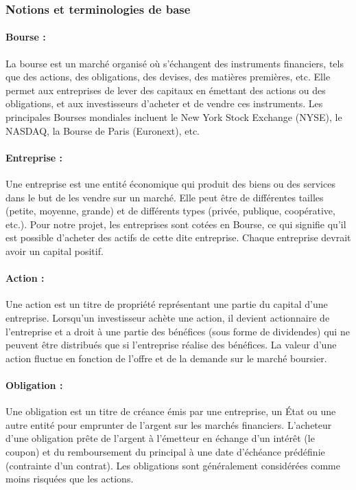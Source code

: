 \subsubsection{Notions et terminologies de base}

\paragraph{Bourse :} La bourse est un marché organisé où s'échangent des instruments financiers,
tels que des actions, des obligations, des devises, des matières premières, etc. Elle
permet aux entreprises de lever des capitaux en émettant des actions ou des
obligations, et aux investisseurs d'acheter et de vendre ces instruments. Les principales
Bourses mondiales incluent le New York Stock Exchange (NYSE), le NASDAQ, la Bourse
de Paris (Euronext), etc.

\paragraph{Entreprise :} Une entreprise est une entité économique qui produit des biens ou des
services dans le but de les vendre sur un marché. Elle peut être de différentes tailles
(petite, moyenne, grande) et de différents types (privée, publique, coopérative, etc.). Pour notre projet, les
entreprises sont cotées en Bourse, ce qui signifie qu'il est possible d'acheter des actifs de cette 
 dite entreprise. Chaque entreprise devrait avoir un
capital positif.

\paragraph{Action :} Une action est un titre de propriété représentant une partie du capital d'une
entreprise. Lorsqu'un investisseur achète une action, il devient actionnaire de
l'entreprise et a droit à une partie des bénéfices (sous forme de dividendes) qui ne
peuvent être distribués que si l'entreprise réalise des bénéfices. La valeur d'une action
fluctue en fonction de l'offre et de la demande sur le marché boursier.

\paragraph{Obligation :} Une obligation est un titre de créance émis par une entreprise, un État ou
une autre entité pour emprunter de l'argent sur les marchés financiers. L'acheteur d'une
obligation prête de l'argent à l'émetteur en échange d'un intérêt (le coupon) et du
remboursement du principal à une date d'échéance prédéfinie (contrainte d’un contrat).
Les obligations sont généralement considérées comme moins risquées que les actions.

